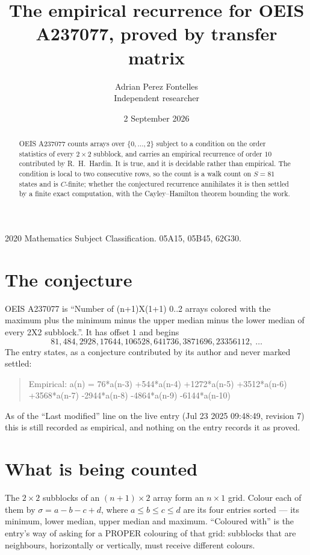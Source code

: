 \documentclass[11pt,a4paper]{article}
\title{The empirical recurrence for OEIS A237077, proved by transfer matrix}
\author{Adrian Perez Fontelles\\ \small Independent researcher}
\date{2 September 2026}
\theoremstyle{plain}
\theoremstyle{definition}
\begin{document}
\maketitle

\begin{abstract}
OEIS A237077 counts arrays over $\{0,\dots,2\}$ subject to a condition on the order
statistics of every $2\times2$ subblock, and carries an empirical recurrence of order
$10$ contributed by R.~H.~Hardin. It is true, and it is decidable rather than empirical.
The condition is local to two consecutive rows, so the count is a walk count on $S=81$
states and is $C$-finite; whether the conjectured recurrence annihilates it is then settled by
a finite exact computation, with the Cayley--Hamilton theorem bounding the work.
\end{abstract}

\noindent\small 2020 Mathematics Subject Classification. 05A15, 05B45, 62G30.\normalsize

\section{The conjecture}

OEIS A237077 is ``Number of (n+1)X(1+1) 0..2 arrays colored with the maximum plus the minimum minus the upper median minus the lower median of every 2X2 subblock.''. It has offset $1$ and begins
\[
81, 484, 2928, 17644, 106528, 641736, 3871696, 23356112,\ \dots
\]
The entry states, as a conjecture contributed by its author and never marked settled:
\begin{quote}
Empirical: a(n) = 76*a(n-3) +544*a(n-4) +1272*a(n-5) +3512*a(n-6) +3568*a(n-7) -2944*a(n-8) -4864*a(n-9) -6144*a(n-10)
\end{quote}
As of the ``Last modified'' line on the live entry (Jul 23 2025 09:48:49, revision 7) this is still
recorded as empirical, and nothing on the entry records it as proved.

\section{What is being counted}

The $2\times2$ subblocks of an $(n+1)\times2$ array form an
$n\times1$ grid. Colour each of them by $\sigma=a-b-c+d$, where $a\le b\le c\le d$ are its four entries sorted --- its minimum, lower median, upper median and maximum. ``Coloured with'' is the entry's way of
asking for a PROPER colouring of that grid: subblocks that are neighbours, horizontally or
vertically, must receive different colours.
\end{document}
